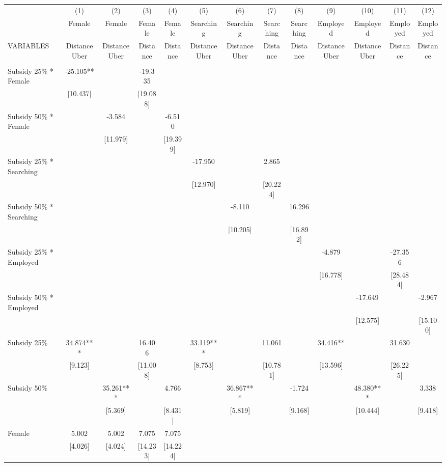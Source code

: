 \begin{tabular}{lcccccccccccc} \hline
 & (1) & (2) & (3) & (4) & (5) & (6) & (7) & (8) & (9) & (10) & (11) & (12) \\
 & Female & Female & Female & Female & Searching & Searching & Searching & Searching & Employed & Employed & Employed & Employed \\
VARIABLES & Distance Uber & Distance Uber & Distance & Distance & Distance Uber & Distance Uber & Distance & Distance & Distance Uber & Distance Uber & Distance & Distance \\ \hline
 &  &  &  &  &  &  &  &  &  &  &  &  \\
Subsidy 25\% * Female & -25.105** &  & -19.335 &  &  &  &  &  &  &  &  &  \\
 & [10.437] &  & [19.088] &  &  &  &  &  &  &  &  &  \\
Subsidy 50\% * Female &  & -3.584 &  & -6.510 &  &  &  &  &  &  &  &  \\
 &  & [11.979] &  & [19.399] &  &  &  &  &  &  &  &  \\
Subsidy 25\% * Searching &  &  &  &  & -17.950 &  & 2.865 &  &  &  &  &  \\
 &  &  &  &  & [12.970] &  & [20.224] &  &  &  &  &  \\
Subsidy 50\% * Searching &  &  &  &  &  & -8.110 &  & 16.296 &  &  &  &  \\
 &  &  &  &  &  & [10.205] &  & [16.892] &  &  &  &  \\
Subsidy 25\% * Employed &  &  &  &  &  &  &  &  & -4.879 &  & -27.356 &  \\
 &  &  &  &  &  &  &  &  & [16.778] &  & [28.484] &  \\
Subsidy 50\% * Employed &  &  &  &  &  &  &  &  &  & -17.649 &  & -2.967 \\
 &  &  &  &  &  &  &  &  &  & [12.575] &  & [15.100] \\
Subsidy 25\% & 34.874*** &  & 16.406 &  & 33.119*** &  & 11.061 &  & 34.416** &  & 31.630 &  \\
 & [9.123] &  & [11.008] &  & [8.753] &  & [10.781] &  & [13.596] &  & [26.225] &  \\
Subsidy 50\% &  & 35.261*** &  & 4.766 &  & 36.867*** &  & -1.724 &  & 48.380*** &  & 3.338 \\
 &  & [5.369] &  & [8.431] &  & [5.819] &  & [9.168] &  & [10.444] &  & [9.418] \\
Female & 5.002 & 5.002 & 7.075 & 7.075 &  &  &  &  &  &  &  &  \\
 & [4.026] & [4.024] & [14.233] & [14.224] &  &  &  &  &  &  &  &  \\

\end{tabular}
